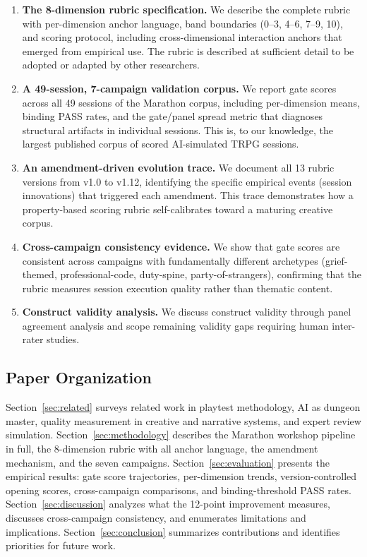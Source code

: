 \begin{enumerate}
  \item \textbf{The 8-dimension rubric specification.} We describe the complete rubric
  with per-dimension anchor language, band boundaries (0--3, 4--6, 7--9, 10), and
  scoring protocol, including cross-dimensional interaction anchors that emerged from
  empirical use. The rubric is described at sufficient detail to be adopted or adapted
  by other researchers.

  \item \textbf{A 49-session, 7-campaign validation corpus.} We report gate scores
  across all 49 sessions of the Marathon corpus, including per-dimension means, binding
  PASS rates, and the gate/panel spread metric that diagnoses structural artifacts in
  individual sessions. This is, to our knowledge, the largest published corpus of
  scored AI-simulated TRPG sessions.

  \item \textbf{An amendment-driven evolution trace.} We document all 13 rubric versions
  from v1.0 to v1.12, identifying the specific empirical events (session innovations)
  that triggered each amendment. This trace demonstrates how a property-based scoring
  rubric self-calibrates toward a maturing creative corpus.

  \item \textbf{Cross-campaign consistency evidence.} We show that gate scores are
  consistent across campaigns with fundamentally different archetypes (grief-themed,
  professional-code, duty-spine, party-of-strangers), confirming that the rubric
  measures session execution quality rather than thematic content.

  \item \textbf{Construct validity analysis.} We discuss construct validity through
  panel agreement analysis and scope remaining validity gaps requiring human
  inter-rater studies.
\end{enumerate}

\subsection{Paper Organization}

Section~\ref{sec:related} surveys related work in playtest methodology, AI as dungeon
master, quality measurement in creative and narrative systems, and expert review
simulation. Section~\ref{sec:methodology} describes the Marathon workshop pipeline in
full, the 8-dimension rubric with all anchor language, the amendment mechanism, and the
seven campaigns. Section~\ref{sec:evaluation} presents the empirical results: gate
score trajectories, per-dimension trends, version-controlled opening scores, cross-campaign
comparisons, and binding-threshold PASS rates. Section~\ref{sec:discussion} analyzes
what the 12-point improvement measures, discusses cross-campaign consistency, and
enumerates limitations and implications. Section~\ref{sec:conclusion} summarizes
contributions and identifies priorities for future work.
